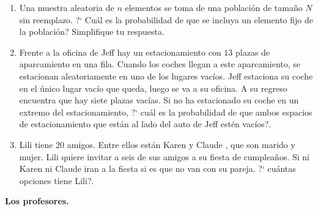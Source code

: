 \documentclass[a4paper,11pt]{report}
\begin{document}
\begin{enumerate}
\item Una muestra aleatoria de $n$ elementos se toma de una poblaci\'on de tama\~no $N$ sin reemplazo. ?` Cu\'al es la probabilidad de que se incluya un elemento fijo de la poblaci\'on? Simplifique tu respuesta. 

\item Frente a la oficina de Jeff hay un estacionamiento con $13$ plazas de aparcamiento en una fila. Cuando los coches llegan a este aparcamiento, se estacionan aleatoriamente en uno de los lugares vac\'ios. Jeff estaciona su coche en el \'unico lugar vac\'io que queda, luego se va a su oficina. A su regreso encuentra que hay siete plazas vac\'ias. Si no ha estacionado su coche en un  extremo del  estacionamiento, ?` cu\'al es la probabilidad de que ambos espacios de estacionamiento que est\'an al lado del auto de Jeff est\'en vac\'ios?.

\item Lili tiene $20$ amigos. Entre ellos est\'an Karen y Claude , que son marido y mujer. Lili quiere invitar a seis de sus amigos a su fiesta de cumplea\~nos. Si ni Karen ni Claude iran  a la fiesta si es que no van  con su pareja. ?` cu\'antas opciones tiene Lili?.

\end{enumerate}

\begin{flushright}
{\bfseries Los profesores.}
\end{flushright}
\end{document}
